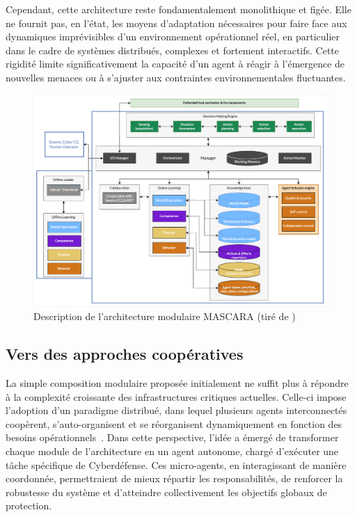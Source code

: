 Cependant, cette architecture reste fondamentalement monolithique et figée. Elle ne fournit pas, en l'état, les moyens d'adaptation nécessaires pour faire face aux dynamiques imprévisibles d'un environnement opérationnel réel, en particulier dans le cadre de systèmes distribués, complexes et fortement interactifs. Cette rigidité limite significativement la capacité d'un agent  à réagir à l'émergence de nouvelles menaces ou à s'ajuster aux contraintes environnementales fluctuantes.


\begin{figure}[h!]
    \centering
    \includegraphics[width=\linewidth]{figures/MASCARA.pdf}
    \caption{Description de l'architecture modulaire MASCARA (tiré de \autocite{Kott2023})}
    \label{fig:mascara}
\end{figure}

\subsection*{Vers des approches coopératives}

La simple composition modulaire proposée initialement ne suffit plus à répondre à la complexité croissante des infrastructures critiques actuelles. Celle-ci impose l'adoption d'un paradigme distribué, dans lequel plusieurs agents interconnectés coopèrent, s'auto-organisent et se réorganisent dynamiquement en fonction des besoins opérationnels~\cite{Ferber1999, Gleizes2008}. Dans cette perspective, l'idée a émergé de transformer chaque module de l'architecture  en un agent autonome, chargé d'exécuter une tâche spécifique de Cyberdéfense. Ces micro-agents, en interagissant de manière coordonnée, permettraient de mieux répartir les responsabilités, de renforcer la robustesse du système et d'atteindre collectivement les objectifs globaux de protection.

